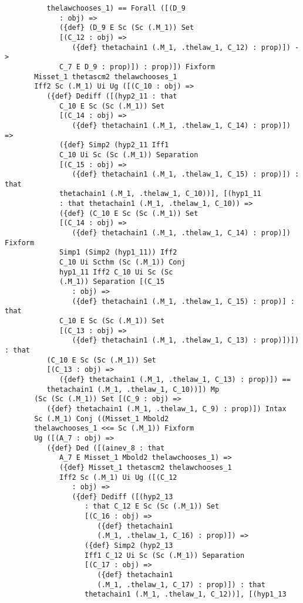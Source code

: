 \documentclass[12pt]{article}
\begin{document}
\begin{verbatim}
          thelawchooses_1) == Forall ([(D_9 
             : obj) => 
             ({def} (D_9 E Sc (Sc (.M_1)) Set 
             [(C_12 : obj) => 
                ({def} thetachain1 (.M_1, .thelaw_1, C_12) : prop)]) -> 
             C_7 E D_9 : prop)]) : prop)]) Fixform 
       Misset_1 thetascm2 thelawchooses_1 
       Iff2 Sc (.M_1) Ui Ug ([(C_10 : obj) => 
          ({def} Dediff ([(hyp2_11 : that 
             C_10 E Sc (Sc (.M_1)) Set 
             [(C_14 : obj) => 
                ({def} thetachain1 (.M_1, .thelaw_1, C_14) : prop)]) => 
             ({def} Simp2 (hyp2_11 Iff1 
             C_10 Ui Sc (Sc (.M_1)) Separation 
             [(C_15 : obj) => 
                ({def} thetachain1 (.M_1, .thelaw_1, C_15) : prop)]) : that 
             thetachain1 (.M_1, .thelaw_1, C_10))], [(hyp1_11 
             : that thetachain1 (.M_1, .thelaw_1, C_10)) => 
             ({def} (C_10 E Sc (Sc (.M_1)) Set 
             [(C_14 : obj) => 
                ({def} thetachain1 (.M_1, .thelaw_1, C_14) : prop)]) Fixform 
             Simp1 (Simp2 (hyp1_11)) Iff2 
             C_10 Ui Scthm (Sc (.M_1)) Conj 
             hyp1_11 Iff2 C_10 Ui Sc (Sc 
             (.M_1)) Separation [(C_15 
                : obj) => 
                ({def} thetachain1 (.M_1, .thelaw_1, C_15) : prop)] : that 
             C_10 E Sc (Sc (.M_1)) Set 
             [(C_13 : obj) => 
                ({def} thetachain1 (.M_1, .thelaw_1, C_13) : prop)])]) : that 
          (C_10 E Sc (Sc (.M_1)) Set 
          [(C_13 : obj) => 
             ({def} thetachain1 (.M_1, .thelaw_1, C_13) : prop)]) == 
          thetachain1 (.M_1, .thelaw_1, C_10))]) Mp 
       (Sc (Sc (.M_1)) Set [(C_9 : obj) => 
          ({def} thetachain1 (.M_1, .thelaw_1, C_9) : prop)]) Intax 
       Sc (.M_1) Conj ((Misset_1 Mbold2 
       thelawchooses_1 <<= Sc (.M_1)) Fixform 
       Ug ([(A_7 : obj) => 
          ({def} Ded ([(ainev_8 : that 
             A_7 E Misset_1 Mbold2 thelawchooses_1) => 
             ({def} Misset_1 thetascm2 thelawchooses_1 
             Iff2 Sc (.M_1) Ui Ug ([(C_12 
                : obj) => 
                ({def} Dediff ([(hyp2_13 
                   : that C_12 E Sc (Sc (.M_1)) Set 
                   [(C_16 : obj) => 
                      ({def} thetachain1 
                      (.M_1, .thelaw_1, C_16) : prop)]) => 
                   ({def} Simp2 (hyp2_13 
                   Iff1 C_12 Ui Sc (Sc (.M_1)) Separation 
                   [(C_17 : obj) => 
                      ({def} thetachain1 
                      (.M_1, .thelaw_1, C_17) : prop)]) : that 
                   thetachain1 (.M_1, .thelaw_1, C_12))], [(hyp1_13 

\end{verbatim}
\end{document}
